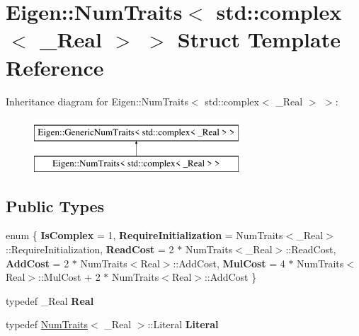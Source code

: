 \hypertarget{struct_eigen_1_1_num_traits_3_01std_1_1complex_3_01___real_01_4_01_4}{}\section{Eigen\+::Num\+Traits$<$ std\+::complex$<$ \+\_\+\+Real $>$ $>$ Struct Template Reference}
\label{struct_eigen_1_1_num_traits_3_01std_1_1complex_3_01___real_01_4_01_4}
Inheritance diagram for Eigen\+::Num\+Traits$<$ std\+::complex$<$ \+\_\+\+Real $>$ $>$\+:\begin{figure}[H]
\begin{center}
\leavevmode
\includegraphics[height=2.000000cm]{struct_eigen_1_1_num_traits_3_01std_1_1complex_3_01___real_01_4_01_4}
\end{center}
\end{figure}
\subsection*{Public Types}
\begin{DoxyCompactItemize}
\item 
\mbox{\label{struct_eigen_1_1_num_traits_3_01std_1_1complex_3_01___real_01_4_01_4_ad991e6339bd59d40a491cd16e1f9da12}} 
enum \{ \newline
{\bfseries Is\+Complex} = 1, 
{\bfseries Require\+Initialization} = Num\+Traits$<$\+\_\+\+Real$>$\+::Require\+Initialization, 
{\bfseries Read\+Cost} = 2 $\ast$ Num\+Traits$<$\+\_\+\+Real$>$\+::Read\+Cost, 
{\bfseries Add\+Cost} = 2 $\ast$ Num\+Traits$<$Real$>$\+::Add\+Cost, 
\newline
{\bfseries Mul\+Cost} = 4 $\ast$ Num\+Traits$<$Real$>$\+::Mul\+Cost + 2 $\ast$ Num\+Traits$<$Real$>$\+::Add\+Cost
 \}
\item 
\mbox{\label{struct_eigen_1_1_num_traits_3_01std_1_1complex_3_01___real_01_4_01_4_af538b9f47fde6290124e8568c021d3b6}} 
typedef \+\_\+\+Real {\bfseries Real}
\item 
\mbox{\label{struct_eigen_1_1_num_traits_3_01std_1_1complex_3_01___real_01_4_01_4_aa017fbbc8a02142f677c28fac53af290}} 
typedef \mbox{\hyperlink{struct_eigen_1_1_num_traits}{Num\+Traits}}$<$ \+\_\+\+Real $>$\+::Literal {\bfseries Literal}
\end{DoxyCompactItemize}
